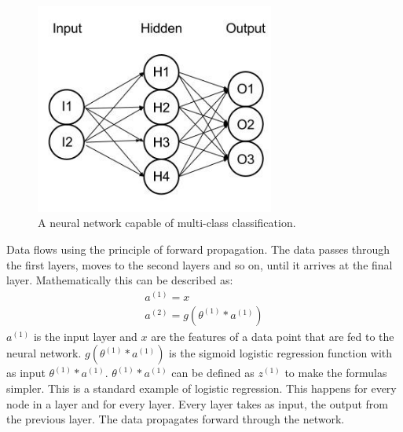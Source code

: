\begin{figure}[H]
\centering
\includegraphics[width=0.7\textwidth]{Figures/neuralnetmulti}
\decoRule
\caption[Neural network with multi-class classification]{A neural network capable of multi-class classification. \cite{neuralnetworkmult}}
\label{fig:neuralnetworkmult}
\end{figure}
\noindent Data flows using the principle of forward propagation. The data passes through the first layers, moves to the second layers and so on, until it arrives at the final layer. Mathematically this can be described as: 
\begin{align*}
a^{(1)} = x\\
a^{(2)} = g( \theta^{(1)}*a^{(1)} )
\end{align*}
$a^{(1)}$ is the input layer and $x$ are the features of a data point that are fed to the neural network. $g( \theta^{(1)}*a^{(1)} )$ is the sigmoid logistic regression function with as input $\theta^{(1)}*a^{(1)}$. $\theta^{(1)}*a^{(1)}$ can be defined as $z^{(1)}$ to make the formulas simpler. This is a standard example of logistic regression. This happens for every node in a layer and for every layer. Every layer takes as input, the output from the previous layer. The data propagates forward through the network. \cite{neuralnetModel2}
